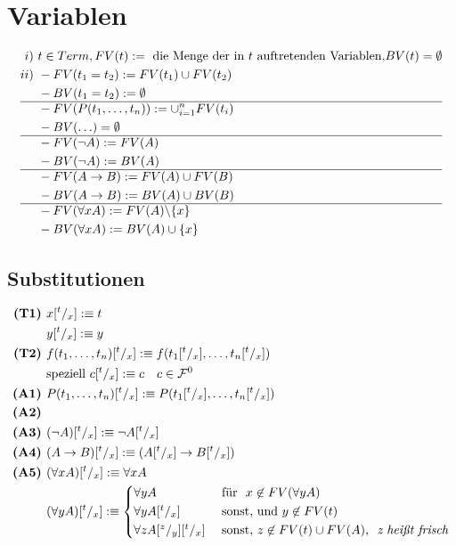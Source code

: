 \documentclass{article}
\begin{document}
		\begin{align*}
		\end{align*}
	\section*{Variablen} 
		\begin{align*}
			i) &\ t \in Term, FV(t) := \text{ die Menge der in } t \text{ auftretenden Variablen,} BV(t) = \emptyset\\
			ii) &\ - FV(t_1 = t_2) := FV(t_1) \cup FV(t_2)\\
			&\ - BV(t_1 = t_2) := \emptyset\\\hline
			&\ - FV(P(t_1, \ldots, t_n)) := \cup^{n}_{i=1} FV(t_i)\\
			&\ - BV(\ldots) = \emptyset\\\hline
			&\ - FV(\neg A) := FV(A)\\
			&\ - BV(\neg A) := BV(A)\\\hline
			&\ - FV(A \rightarrow B) := FV(A) \cup FV(B)\\
			&\ - BV(A \rightarrow B) := BV(A) \cup BV(B)\\\hline
			&\ - FV(\forall x A) := FV(A) \backslash\{x\}\\
			&\ - BV(\forall x A) := BV(A) \cup \{x\}\\
		\end{align*}
		\subsection*{Substitutionen}
			\begin{align*}
				\textbf{(T1) } & x[^t/_x] :\equiv t\\
				& y[^t/_x] :\equiv y\\
				\textbf{(T2) } & f(t_1, \ldots, t_n) [^t/_x] :\equiv f(t_1[^t/_x], \ldots, t_n[^t/_x])\\
				& \text{speziell } c[^t/_x] :\equiv c \quad c \in \mathcal{F}^0\\
				\textbf{(A1) } & P(t_1, \ldots, t_n) [^t/_x] :\equiv P(t_1[^t/_x], \ldots, t_n[^t/_x])\\
				\textbf{(A2) } &\\
				\textbf{(A3) } & (\neg A) [^t/_x] :\equiv \neg A[^t/_x]\\
				\textbf{(A4) } & (A \rightarrow B) [^t/_x] :\equiv (A[^t/_x] \rightarrow B[^t/_x])\\
				\textbf{(A5) } & (\forall x A) [^t/_x] :\equiv \forall x A\\
				& (\forall y A) [^t/_x] :\equiv 
				\begin{cases*}
					\forall y A & \text{ f\"ur } $ x \not \in FV(\forall y A)$\\
					\forall y A[^t/_x] & \text{ sonst, und} $y \not \in FV(t)$\\
					\forall z A[^z/_y][^t/_x] & \text{ sonst,} $z \not \in FV(t) \cup FV(A)$,  \textit{ z hei\ss t frisch}\\
				\end{cases*}
			\end{align*}
\end{document}
